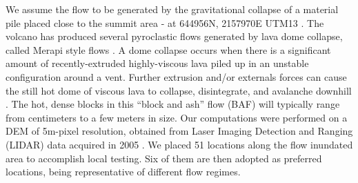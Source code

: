 \documentclass{article}
\begin{document}
We assume the flow to be generated by the gravitational collapse of a material pile placed close to the summit area - at 644956N, 2157970E UTM13 \citep{Rupp2006,Aghakhani2016}. The volcano has produced several pyroclastic flows generated by lava dome collapse, called Merapi style flows \citep{Macorps2018}. A dome collapse occurs when there is a significant amount of recently-extruded highly-viscous lava piled up in an unstable configuration around a vent. Further extrusion and/or externals forces can cause the still hot dome of viscous lava to collapse, disintegrate, and avalanche downhill \citep{Bursik2005, Wolpert2016, Hyman2018}. The hot, dense blocks in this ``block and ash'' flow (BAF) will typically range from centimeters to a few meters in size. Our computations were performed on a DEM of 5m-pixel resolution, obtained from Laser Imaging Detection and Ranging (LIDAR) data acquired in 2005 \citep{Davila2007, Sulpizio2010}. We placed 51 locations along the flow inundated area to accomplish local testing. Six of them are then adopted as preferred locations, being representative of different flow regimes.
\end{document}
